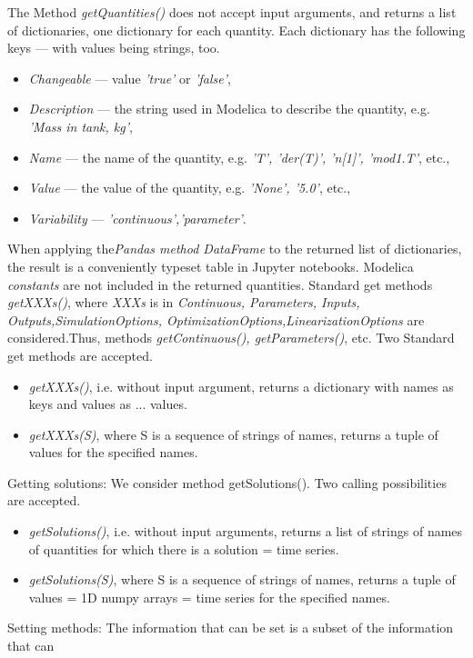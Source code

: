 \begin{enumerate}
	The Method \textit{getQuantities()} does not accept input arguments, and returns a list of dictionaries, one dictionary for each
	quantity. Each dictionary has the following keys — with values being strings, too.
	\begin{itemize}
		\item \textit{Changeable} — value \textit{'true'} or \textit{'false'},
		\item \textit{Description} — the string used in Modelica to describe the quantity, e.g. \textit{'Mass in tank, kg'},
		\item \textit{Name} — the name of the quantity, e.g. \textit{'T', 'der(T)', 'n[1]', 'mod1.T'}, etc.,
		\item \textit{Value} — the value of the quantity, e.g. \textit{'None', '5.0'}, etc.,
		\item \textit{Variability} — \textit{'continuous','parameter'}.
    \end{itemize}
	When applying the\textit{Pandas method DataFrame} to the returned list of dictionaries, the result is a conveniently
	typeset table in Jupyter notebooks. Modelica \textit{constants} are not included in the returned quantities. Standard get 
	methods \textit{getXXXs()}, where \textit{XXXs} is in	\textit{{Continuous, Parameters, Inputs, Outputs,SimulationOptions, OptimizationOptions,LinearizationOptions}} are considered.Thus, methods \textit{getContinuous(), getParameters()}, etc.
	Two Standard get methods are accepted.
	\begin{itemize}
		\item \textit{getXXXs()}, i.e. without input argument, returns a dictionary with names as keys and values as ... values.
		\item \textit{getXXXs(S)}, where S is a sequence of strings of names, returns a tuple of values for the specified names.
    \end{itemize}
	Getting solutions: We consider method getSolutions(). Two calling possibilities are accepted.
	\begin{itemize}
		\item \textit{getSolutions()}, i.e. without input arguments, returns a list of strings of names of quantities for
			          which there is a solution = time series.
		\item \textit{getSolutions(S)}, where S is a sequence of strings of names, returns a tuple of values = 1D
					numpy arrays = time series for the specified names.
	\end{itemize}
	Setting methods: The information that can be set is a subset of the information that can

\end{enumerate}
